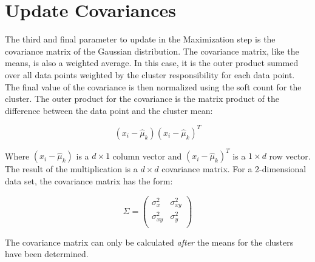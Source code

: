 \documentclass[12pt]{article}
\begin{document}
    \hypertarget{update-covariances}{%
\section{Update Covariances}\label{update-covariances}}

The third and final parameter to update in the Maximization step is the
covariance matrix of the Gaussian distribution. The covariance matrix,
like the means, is also a weighted average. In this case, it is the
outer product summed over all data points weighted by the cluster
responsibility for each data point. The final value of the covariance is
then normalized using the soft count for the cluster. The outer product
for the covariance is the matrix product of the difference between the
data point and the cluster mean:

\[(x_i - \hat{\mu}_k)(x_i - \hat{\mu}_k)^T\]

Where \((x_i - \hat{\mu}_k)\) is a \(d \times 1\) column vector and
\((x_i - \hat{\mu}_k)^T\) is a \(1 \times d\) row vector. The result of
the multiplication is a \(d \times d\) covariance matrix. For a
2-dimensional data set, the covariance matrix has the form:

\[\Sigma = \left( \begin{array}{cc}
\sigma_{x}^2 & \sigma_{xy}^2 \\
\sigma_{xy}^2 & \sigma_{y}^2 \\
 \end{array} \right) \]

The covariance matrix can only be calculated \emph{after} the means for
the clusters have been determined.
\end{document}
